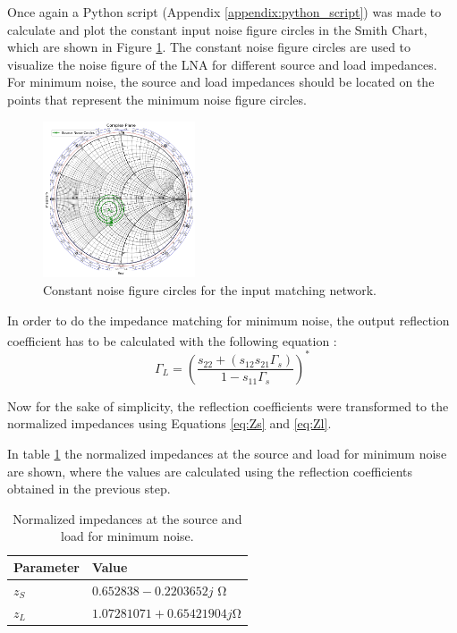 Once again a Python script (Appendix \ref{appendix:python_script}) was made to calculate and plot the constant input noise figure circles in the Smith Chart, which are shown in Figure \ref{fig:ConstantNoiseCircles}. The constant noise figure circles are used to visualize the noise figure of the LNA for different source and load impedances. For minimum noise, the source and load impedances should be located on the points that represent the minimum noise figure circles.

\begin{figure}[H]
    \centering
    \includegraphics[width=0.4\textwidth]{Images/ConstantNoiseCircles.png}
    \caption{Constant noise figure circles for the input matching network.}
    \label{fig:ConstantNoiseCircles}
\end{figure}    

In order to do the impedance matching for minimum noise, the output reflection coefficient has to be calculated with the following equation \textsuperscript{\cite{Slides}}:
\begin{equation}
    \Gamma_{L} = (\frac{s_{22}+(s_{12}s_{21}\Gamma_s)}{1-s_{11}\Gamma_s})^*
    \label{eq:GammaL-noise}
\end{equation}

Now for the sake of simplicity, the reflection coefficients were transformed to the normalized impedances using Equations \ref{eq:Zs} and \ref{eq:Zl}.

In table \ref{tab: noise-impedances} the normalized impedances at the source and load for minimum noise are shown, where the values are calculated using the reflection coefficients obtained in the previous step.

\begin{table}[H]
    \centering
    \caption{Normalized impedances at the source and load for minimum noise.}
    \begin{tabularx}{\textwidth}{>{\centering\arraybackslash}X >{\centering\arraybackslash}X}
        \toprule
        \textbf{Parameter} & \textbf{Value} \\
        \midrule
        $z_{S}$     & $0.652838-0.2203652j$ \si{\ohm} \\
        \midrule
        $z_{L}$     & $1.07281071+0.65421904j$\si{\ohm}\\
        \bottomrule
    \end{tabularx}
    \label{tab: noise-impedances}
\end{table}

